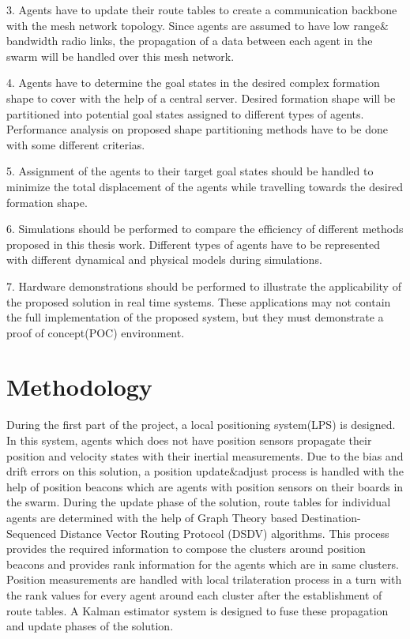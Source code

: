 3. Agents have to update their route tables to create a communication backbone with the mesh network topology. Since agents are assumed to have low range$\&$bandwidth radio links, the propagation of a data between each agent in the swarm will be handled over this mesh network. 

4. Agents have to determine the goal states in the desired complex formation shape to cover with the help of a central server. Desired formation shape will be partitioned into potential goal states assigned to different types of agents. Performance analysis on proposed shape partitioning methods have to be done with some different criterias. 

5. Assignment of the agents to their target goal states should be handled to minimize the total displacement of the agents while travelling towards the desired formation shape. 

6. Simulations should be performed to compare the efficiency of different methods proposed in this thesis work. Different types of agents have to be represented with different dynamical and physical models during simulations.

7. Hardware demonstrations should be performed to illustrate the applicability of the proposed solution in real time systems. These applications may not contain the full implementation of the proposed system, but they must demonstrate a proof of concept(POC) environment.

\section{Methodology}
During the first part of the project, a local positioning system(LPS) is designed. In this system, agents which does not have position sensors propagate their position and velocity states with their inertial measurements. Due to the bias and drift errors on this solution, a position update$\&$adjust process is handled with the help of position beacons which are agents with position sensors on their boards in the swarm. During the update phase of the solution, route tables for individual agents are determined with the help of Graph Theory based Destination-Sequenced Distance Vector Routing Protocol (DSDV) algorithms. This process provides the required information to compose the clusters around position beacons and provides rank information for the agents which are in same clusters. Position measurements are handled with local trilateration process in a turn with the rank values for every agent around each cluster after the establishment of route tables. A Kalman estimator system is designed to fuse these propagation and update phases of the solution.

